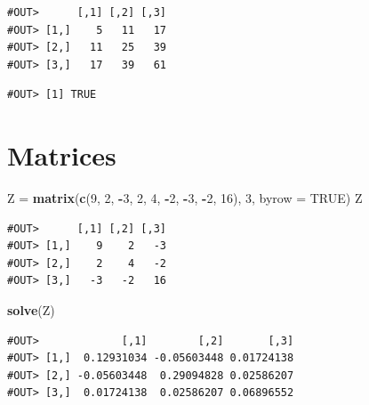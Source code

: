 \documentclass[]{book}
\newenvironment{Shaded}{\begin{snugshade}}{\end{snugshade}}
\newcommand{\KeywordTok}[1]{\textcolor[rgb]{0.13,0.29,0.53}{\textbf{#1}}}
\newcommand{\DataTypeTok}[1]{\textcolor[rgb]{0.13,0.29,0.53}{#1}}
\newcommand{\DecValTok}[1]{\textcolor[rgb]{0.00,0.00,0.81}{#1}}
\newcommand{\StringTok}[1]{\textcolor[rgb]{0.31,0.60,0.02}{#1}}
\newcommand{\OtherTok}[1]{\textcolor[rgb]{0.56,0.35,0.01}{#1}}
\newcommand{\OperatorTok}[1]{\textcolor[rgb]{0.81,0.36,0.00}{\textbf{#1}}}
\newcommand{\NormalTok}[1]{#1}
\theoremstyle{definition}
\theoremstyle{definition}
\theoremstyle{definition}
\theoremstyle{remark}
\begin{document}
\begin{verbatim}
#OUT>      [,1] [,2] [,3]
#OUT> [1,]    5   11   17
#OUT> [2,]   11   25   39
#OUT> [3,]   17   39   61
\end{verbatim}

\begin{Shaded}
\end{Shaded}

\begin{verbatim}
#OUT> [1] TRUE
\end{verbatim}

\section{Matrices}\label{matrices-1}

\begin{Shaded}
\begin{Highlighting}[]
\NormalTok{Z =}\StringTok{ }\KeywordTok{matrix}\NormalTok{(}\KeywordTok{c}\NormalTok{(}\DecValTok{9}\NormalTok{, }\DecValTok{2}\NormalTok{, }\OperatorTok{-}\DecValTok{3}\NormalTok{, }\DecValTok{2}\NormalTok{, }\DecValTok{4}\NormalTok{, }\OperatorTok{-}\DecValTok{2}\NormalTok{, }\OperatorTok{-}\DecValTok{3}\NormalTok{, }\OperatorTok{-}\DecValTok{2}\NormalTok{, }\DecValTok{16}\NormalTok{), }\DecValTok{3}\NormalTok{, }\DataTypeTok{byrow =} \OtherTok{TRUE}\NormalTok{)}
\NormalTok{Z}
\end{Highlighting}
\end{Shaded}

\begin{verbatim}
#OUT>      [,1] [,2] [,3]
#OUT> [1,]    9    2   -3
#OUT> [2,]    2    4   -2
#OUT> [3,]   -3   -2   16
\end{verbatim}

\begin{Shaded}
\begin{Highlighting}[]
\KeywordTok{solve}\NormalTok{(Z)}
\end{Highlighting}
\end{Shaded}

\begin{verbatim}
#OUT>             [,1]        [,2]       [,3]
#OUT> [1,]  0.12931034 -0.05603448 0.01724138
#OUT> [2,] -0.05603448  0.29094828 0.02586207
#OUT> [3,]  0.01724138  0.02586207 0.06896552
\end{verbatim}
\end{document}
